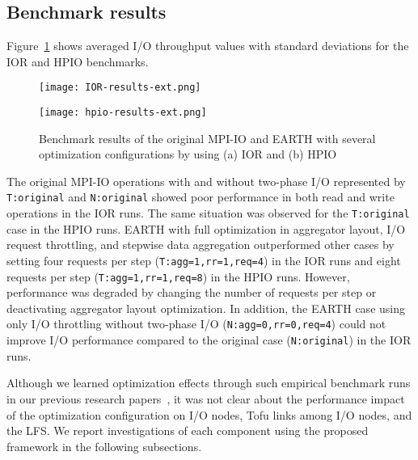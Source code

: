 \documentclass{jhps}
\begin{document}
\subsection{Benchmark results}

Figure~\ref{fig:IOR_HPIO_PERF} shows averaged I/O throughput values
with standard deviations for the IOR and HPIO benchmarks. 
%
\begin{figure}[tb]
\centering
\begin{minipage}[t]{0.46\textwidth}
 \centering
 \texttt{[image: IOR-results-ext.png]}
 \label{fig:IOR_PERF}
\end{minipage}
%
\noindent
\begin{minipage}[t]{0.46\textwidth}
 \texttt{[image: hpio-results-ext.png]}
 \label{fig:HPIO_PERF}
\end{minipage}
\caption{
Benchmark results of the original MPI-IO and EARTH with several optimization
configurations by using (a) IOR and (b) HPIO}
\label{fig:IOR_HPIO_PERF}
\end{figure}
%

The original MPI-IO operations with and without two-phase I/O represented by
{\tt T:original} and {\tt N:original} showed poor performance in both read and write
operations in the IOR runs.
The same situation was observed for the {\tt T:original} case in the HPIO runs.
EARTH with full optimization in aggregator layout, I/O request throttling,
and stepwise data aggregation outperformed other cases by setting four requests per step
({\tt T:agg=1,rr=1,req=4}) in the IOR runs and eight requests per step
({\tt T:agg=1,rr=1,req=8}) in the HPIO runs.
However, performance was degraded by changing the number of requests per step
or deactivating aggregator layout optimization.
In addition, the EARTH case using only I/O throttling without two-phase I/O
({\tt N:agg=0,rr=0,req=4}) could not improve I/O performance
compared to the original case ({\tt N:original}) in the IOR runs.

Although we learned optimization effects through such empirical benchmark runs
in our previous research papers~\cite{tsujita:WS_EuroMPI2014,tsujita:hpcasia18},
it was not clear about the performance impact of the optimization configuration
on I/O nodes, Tofu links among I/O nodes, and the LFS.
We report investigations of each component using the proposed framework
in the following subsections.

\end{document}
